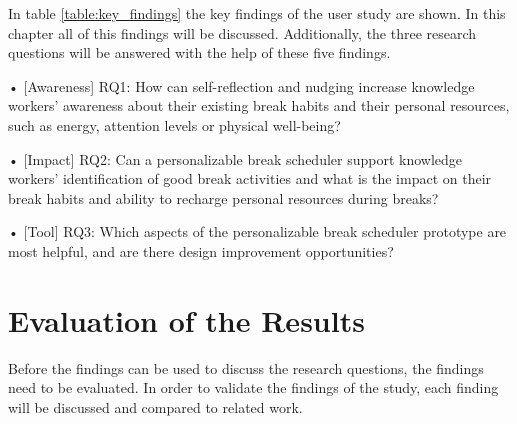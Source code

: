 \documentclass{hasel_thesis}
\begin{document}
In table \ref{table:key_findings} the key findings of the user study are shown. In this chapter all of this findings will be discussed. Additionally,  the three research questions will be answered with the help of these five findings.

\begin{tcolorbox}[colback=white!5!white,colframe=black!75!black]
 •	[Awareness] RQ1: How can self-reflection and nudging increase knowledge workers' awareness about their existing break habits and their personal resources, such as energy, attention levels or physical well-being?

•	[Impact] RQ2: Can a personalizable break scheduler support knowledge workers' identification of good break activities and what is the impact on their break habits and ability to recharge personal resources during breaks?

•	[Tool] RQ3: Which aspects of the personalizable break scheduler prototype are most helpful, and are there design improvement opportunities?

\end{tcolorbox}

\section{Evaluation of the Results}
Before the findings can be used to discuss the research questions, the findings need to be evaluated. In order to validate the findings of the study, each finding will be discussed and compared to related work. 
\end{document}
